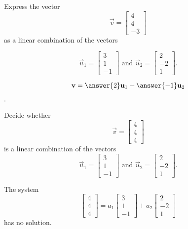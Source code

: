\documentclass{ximera}
\begin{document}
\begin{problem}\label{prb:3.3}
Express the vector
\begin{equation*}
\vec{v}= 
\begin{bmatrix}
4 \\
4 \\
-3
\end{bmatrix}
\end{equation*}
as a linear combination of the vectors

\begin{equation*}
\vec{u}_1 = 
\begin{bmatrix}
3 \\
1 \\
-1
\end{bmatrix}
\mbox{ and  }
\vec{u}_2 =
\begin{bmatrix}
2 \\
-2\\
1
\end{bmatrix}.
\end{equation*}

$$\vec{v}=\answer{2}\vec{u}_1 +\answer{-1}\vec{u}_2$$.

\end{problem}


\begin{problem}\label{prb:3.4}
Decide whether
\begin{equation*}
\vec{v}= 
\begin{bmatrix}
4 \\
4 \\
4
\end{bmatrix}
\end{equation*}
is a linear combination of the vectors
\begin{equation*}
\vec{u}_1 = 
\begin{bmatrix}
3 \\
1 \\
-1
\end{bmatrix}
\mbox{ and  }
\vec{u}_2 =
\begin{bmatrix}
2 \\
-2\\
1
\end{bmatrix}.
\end{equation*}

\begin{hint}
The system
\begin{equation*}
\left[
\begin{array}{r}
4 \\
4 \\
4
\end{array}
\right]
=
a_1
\left[
\begin{array}{r}
3 \\
1 \\
-1
\end{array}
\right]
+a_2
\left[
\begin{array}{r}
2 \\
-2\\
1
\end{array}
\right]
\end{equation*}
has no solution.
\end{hint}
\end{problem}
\end{document}
